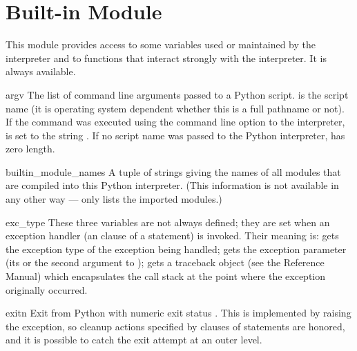 \section{Built-in Module }

This module provides access to some variables used or maintained by the
interpreter and to functions that interact strongly with the interpreter.
It is always available.

\renewcommand{\indexsubitem}{(in module sys)}

\begin{datadesc}{argv}
  The list of command line arguments passed to a Python script.
   is the script name (it is operating system
  dependent whether this is a full pathname or not).
  If the command was executed using the  command line option
  to the interpreter,  is set to the string
  .
  If no script name was passed to the Python interpreter,
   has zero length.
\end{datadesc}

\begin{datadesc}{builtin_module_names}
  A tuple of strings giving the names of all modules that are compiled
  into this Python interpreter.  (This information is not available in
  any other way ---  only lists the imported
  modules.)
\end{datadesc}

\begin{datadesc}{exc_type}
  These three variables are not always defined; they are set when an
  exception handler (an  clause of a  statement) is
  invoked.  Their meaning is:  gets the exception type of
  the exception being handled;  gets the exception
  parameter (its  or the second argument to
  );  gets a traceback object (see the
  Reference Manual) which
  encapsulates the call stack at the point where the exception
  originally occurred.
\end{datadesc}

\begin{funcdesc}{exit}{n}
  Exit from Python with numeric exit status .  This is
  implemented by raising the  exception, so cleanup
  actions specified by  clauses of  statements
  are honored, and it is possible to catch the exit attempt at an outer
  level.
\end{funcdesc}

